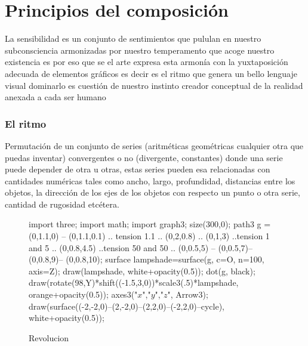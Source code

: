\chapter{Principios del composición}

La sensibilidad es un conjunto de sentimientos que pululan en nuestro subconsciencia armonizadas por nuestro temperamento que acoge nuestro existencia es por eso que se el arte expresa esta armonía con la yuxtaposición adecuada de elementos gráficos es decir es el ritmo que genera un bello lenguaje visual dominarlo es cuestión de nuestro instinto creador conceptual de la realidad anexada a cada ser humano
\subsection{El ritmo} Permutación de un conjunto de series (aritméticas geométricas cualquier otra que puedas inventar) convergentes o no (divergente, constantes) donde una serie puede depender de otra u otras, estas series pueden esa relacionadas con cantidades numéricas tales como ancho, largo, profundidad, distancias entre los objetos, la dirección de los ejes de los objetos con respecto un punto o otra serie, cantidad de rugosidad etcétera.


\begin{figure}
	\begin{asy}
	import three;
import math;
import graph3;
size(300,0);
path3 g =(0,1.1,0) -- (0,1.1,0.1) .. tension 1.1 ..	(0,2,0.8) ..	(0,1,3) ..tension 1 and 5 .. (0,0.8,4.5) ..tension 50 and 50 .. (0,0.5,5) -- (0,0.5,7)-- (0,0.8,9)-- (0,0.8,10);
surface lampshade=surface(g, c=O, n=100, axis=Z);
draw(lampshade, white+opacity(0.5));
dot(g, black);
draw(rotate(98,Y)*shift((-1.5,3,0))*scale3(.5)*lampshade, orange+opacity(0.5));
axes3("$x$","$y$","$z$", Arrow3);
draw(surface((-2,-2,0)--(2,-2,0)--(2,2,0)--(-2,2,0)--cycle), white+opacity(0.5));
\end{asy}
\caption{Revolucion}
\end{figure}




